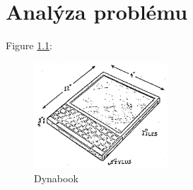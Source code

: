 \chapter{Analýza problému}


\lipsum

Figure \ref{fig:dynabook}:

\begin{figure}[h]
\begin{centering}
\includegraphics[width=5cm]{assets/images/Dynabook}
\par\end{centering}
\caption{Dynabook \label{fig:dynabook}}
\end{figure}